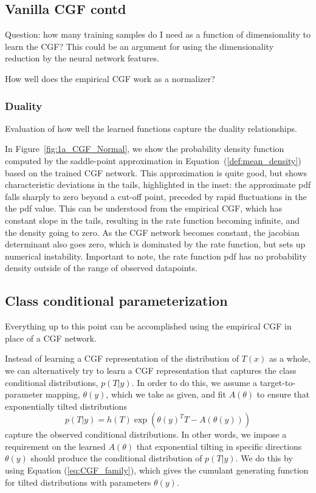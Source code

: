 \documentclass[11pt]{article}      %
\begin{document}
\newpage
\subsection{Vanilla CGF contd}
Question: how many training samples do I need as a function of dimensionality to learn the CGF? This could be an argument for using the dimensionality reduction by the neural network features.

How well does the empirical CGF work as a normalizer?

\subsubsection{Duality}
Evaluation of how well the learned functions capture the duality relationships.






In Figure~\ref{fig:1a_CGF_Normal}, we show the probability density function computed by the saddle-point approximation in Equation~(\ref{def:mean_density}) based on the trained CGF network.
This approximation is quite good, but shows characteristic deviations in the tails, highlighted in the inset:
the approximate pdf falls sharply to zero beyond a cut-off point, preceded by rapid fluctuations in the the pdf value.
This can be understood from the empirical CGF, which has constant slope in the tails, resulting in the rate function becoming infinite, and the density going to zero.
As the CGF network becomes constant, the jacobian determinant also goes zero, which is dominated by the rate function, but sets up numerical instability.
Important to note, the rate function pdf has no probability density outside of the range of observed datapoints.




\subsection{Class conditional parameterization}

Everything up to this point can be accomplished using the empirical CGF in place of a CGF network.

Instead of learning a CGF representation of the distribution of $T(x)$ as a whole, we can alternatively try to learn a CGF representation that captures the class conditional distributions, $p(T|y)$.
In order to do this, we assume a target-to-parameter mapping, $\theta(y)$, which we take as given, and fit $A(\theta)$ to ensure that exponentially tilted distributions
\begin{equation}
  p(T|y) = h(T) \exp(\theta(y)^T T - A(\theta(y))) \label{eq:class_conditional}
\end{equation}
capture the observed conditional distributions.
In other words, we impose a requirement on the learned $A(\theta)$ that exponential tilting in specific directions $\theta(y)$ should produce the conditional distribution of $p(T|y)$.
We do this by using Equation (\ref{eq:CGF_family}), which gives the cumulant generating function for tilted distributions with parameters $\theta(y)$.
\end{document}
